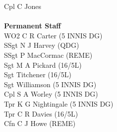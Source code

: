 \begin{multicols}{2}
  Cpl C Jones \\
  \\
  \textbf{Permanent Staff} \\
  WO2 C R Carter (5 INNIS DG) \\
  SSgt N J Harvey (QDG) \\
  SSgt P MacCormac (REME) \\
  Sgt M A Pickard (16/5L) \\
  Sgt Titchener (16/5L) \\
  Sgt Williamson (5 INNIS DG) \\
  Cpl S A Worley (5 INNIS DG) \\
  Tpr K G Nightingale (5 INNIS DG) \\
  Tpr C R Davies (16/5L) \\
  Cfn C J Howe (REME) \\
\end{multicols}
